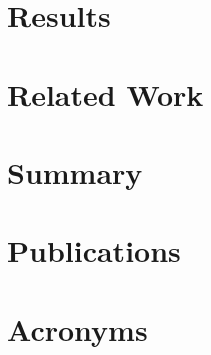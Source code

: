 %

%    

\chapter{Results}

\label{chap:results}
    

\chapter{Related Work}
\label{chap:related}

    


\chapter{Summary}
\label{chap:conclusions}

    





\appendix
 \ihead{\leftmark} %

\chapter{Publications}
    

\chapter{Acronyms}
 \label{appx:acro}




